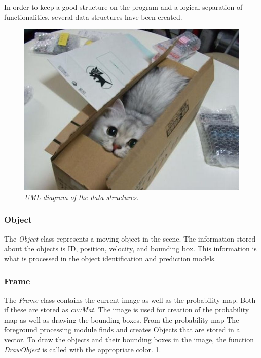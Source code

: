In order to keep a good structure on the program and a logical separation of functionalities, several data structures have been created.

\begin{figure}[htb]
	\centering
	\includegraphics[width=\linewidth]{images/acatisfinetoo}
	\caption{\textit{UML diagram of the data structures.}}
	\label{fig:UML_fig} %
\end{figure}


\subsubsection{Object}
The \emph{Object} class represents a moving object in the scene. The information stored about the objects is ID, position, velocity, and bounding box. This information is what is processed in the object identification and prediction models. 

\subsubsection{Frame}
The \emph{Frame} class contains the current image as well as the probability map. Both if these are stored as \emph{cv::Mat}. The image is used for creation of the probability map as well as drawing the bounding boxes. From the probability map The foreground processing module finds and creates Objects that are stored in a vector. To draw the objects and their bounding boxes in the image, the function \emph{DrawObject} is called with the appropriate color. \ref{fig:UML_fig}. %

